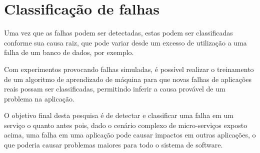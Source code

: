 \section{Classificação de falhas}
\label{sec:classificacao-de-falhas}

Uma vez que as falhas podem ser detectadas, estas podem ser classificadas
conforme sua causa raiz, que pode variar desde um excesso de utilização a uma
falha de um banco de dados, por exemplo.

Com experimentos provocando falhas simuladas, é possível realizar o treinamento
de um algoritmo de aprendizado de máquina para que novas falhas de aplicações
reais possam ser classificadas, permitindo inferir a causa provável de um
problema na aplicação.

O objetivo final desta pesquisa é de detectar e classificar uma falha em um
serviço o quanto antes pois, dado o cenário complexo de micro-serviços exposto
acima, uma falha em uma aplicação pode causar impactos em outras aplicações,
o que poderia causar problemas maiores para todo o sistema de software.
